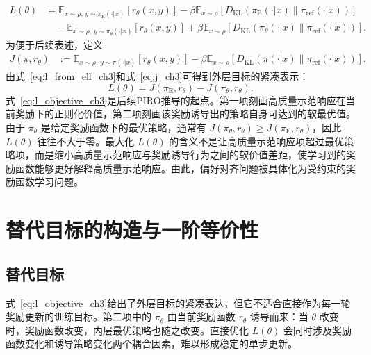 \begin{equation}
\begin{aligned}
    L(\theta)
    &=
    \mathbb{E}_{x\sim\rho,\,y\sim\pi_{\mathrm{E}}(\cdot|x)}
    \left[r_\theta(x,y)\right]
    -\beta\mathbb{E}_{x\sim\rho}
    \left[D_{\mathrm{KL}}\!\left(\pi_{\mathrm{E}}(\cdot|x)\|\pi_{\mathrm{ref}}(\cdot|x)\right)\right]\\
    &\quad-
    \mathbb{E}_{x\sim\rho,\,y\sim\pi_\theta(\cdot|x)}
    \left[r_\theta(x,y)\right]
    +\beta\mathbb{E}_{x\sim\rho}
    \left[D_{\mathrm{KL}}\!\left(\pi_\theta(\cdot|x)\|\pi_{\mathrm{ref}}(\cdot|x)\right)\right].
    \label{eq:l_from_ell_ch3}
\end{aligned}
\end{equation}
为便于后续表述，定义
\begin{equation}
\begin{aligned}
    J(\pi,r_\theta)
    &:={}
    \mathbb{E}_{x\sim\rho,\,y\sim\pi(\cdot|x)}
    \left[r_\theta(x,y)\right]
    -\beta\mathbb{E}_{x\sim\rho}
    \left[D_{\mathrm{KL}}\!\left(\pi(\cdot|x)\|\pi_{\mathrm{ref}}(\cdot|x)\right)\right].
\end{aligned}
\label{eq:j_ch3}
\end{equation}
由式~\eqref{eq:l_from_ell_ch3}和式~\eqref{eq:j_ch3}可得到外层目标的紧凑表示：
\begin{equation}
    L(\theta)=J(\pi_{\mathrm{E}},r_\theta)-J(\pi_\theta,r_\theta).
    \label{eq:l_objective_ch3}
\end{equation}
式~\eqref{eq:l_objective_ch3}是后续PIRO推导的起点。第一项刻画高质量示范响应在当前奖励下的正则化价值，第二项刻画该奖励诱导出的策略自身可达到的软最优值。由于 $\pi_\theta$ 是给定奖励函数下的最优策略，通常有 $J(\pi_\theta,r_\theta)\ge J(\pi_{\mathrm{E}},r_\theta)$，因此 $L(\theta)$ 往往不大于零。最大化 $L(\theta)$ 的含义不是让高质量示范响应项超过最优策略项，而是缩小高质量示范响应与奖励诱导行为之间的软价值差距，使学习到的奖励函数能够更好解释高质量示范响应。由此，偏好对齐问题被具体化为受约束的奖励函数学习问题。

\section{替代目标的构造与一阶等价性}

\subsection{替代目标}

式~\eqref{eq:l_objective_ch3}给出了外层目标的紧凑表达，但它不适合直接作为每一轮奖励更新的训练目标。第二项中的 $\pi_\theta$ 由当前奖励函数 $r_\theta$ 诱导而来：当 $\theta$ 改变时，奖励函数改变，内层最优策略也随之改变。直接优化 $L(\theta)$ 会同时涉及奖励函数变化和诱导策略变化两个耦合因素，难以形成稳定的单步更新。

